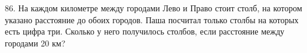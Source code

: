 86. На каждом километре между городами Лево и Право стоит столб, на котором указано расстояние до обоих городов. Паша посчитал только столбы на которых есть цифра три. Сколько у него получилось столбов, если расстояние между городами 20 км?\\
